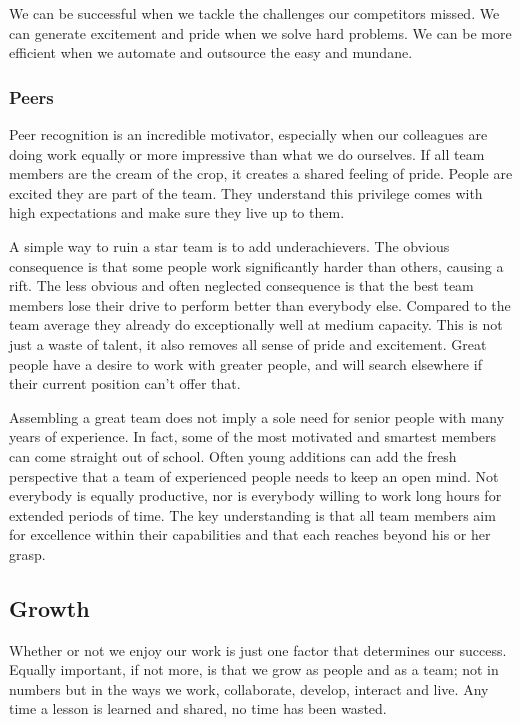 \documentclass[twocolumn]{paper}
\begin{document}
We can be successful when we tackle the challenges our competitors
missed. We can generate excitement and pride when we solve hard
problems. We can be more efficient when we automate and outsource
the easy and mundane.

\subsubsection{Peers}

Peer recognition is an incredible motivator, especially when our
colleagues are doing work equally or more impressive than what we do
ourselves. If all team members are the cream of the crop, it creates
a shared feeling of pride. People are excited they are part of the
team. They understand this privilege comes with high expectations
and make sure they live up to them.

A simple way to ruin a star team is to add underachievers. The
obvious consequence is that some people work significantly harder
than others, causing a rift. The less obvious and often neglected
consequence is that the best team members lose their drive to
perform better than everybody else. Compared to the team average
they already do exceptionally well at medium capacity. This is not
just a waste of talent, it also removes all sense of pride and
excitement. Great people have a desire to work with greater people,
and will search elsewhere if their current position can't offer
that.

Assembling a great team does not imply a sole need for senior people
with many years of experience. In fact, some of the most motivated
and smartest members can come straight out of school. Often young
additions can add the fresh perspective that a team of experienced
people needs to keep an open mind. Not everybody is equally
productive, nor is everybody willing to work long hours for extended
periods of time. The key understanding is that all team members aim
for excellence within their capabilities and that each reaches
beyond his or her grasp.

\subsection{Growth}

Whether or not we enjoy our work is just one factor that determines
our success. Equally important, if not more, is that we grow as
people and as a team; not in numbers but in the ways we work,
collaborate, develop, interact and live. Any time a lesson is
learned and shared, no time has been wasted.
\end{document}
